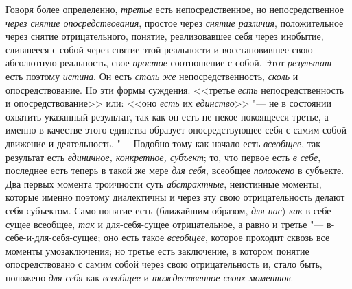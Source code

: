 Говоря более определенно, {\em третье} есть
непосредственное, но непосредственное
{\em через снятие опосредствования}, простое через {\em снятие
различия}, положительное через снятие отрицательного,
понятие, реализовавшее себя через инобытие, слившееся с собой через снятие
этой реальности и восстановившее свою абсолютную реальность, свое
{\em простое} соотношение с собой. Этот {\em результат} есть поэтому
{\em истина}. Он есть {\em столь же} непосредственность, {\em сколь} и
опосредствование. Но эти формы суждения: <<третье {\em есть}
непосредственность и опосредствование>> или: <<оно {\em есть} их
{\em единство}>> "--- не в
состоянии охватить указанный результат, так как он есть не некое покоящееся
третье, а именно в качестве этого единства образует опосредствующее себя с
самим собой движение и деятельность. "--- Подобно тому как
начало есть {\em всеобщее}, так результат есть
{\em единичное, конкретное, субъект}; то, что первое есть {\em в
себе}, последнее есть теперь в такой же мере {\em для себя}, всеобщее
{\em положено} в субъекте. Два первых момента троичности суть
{\em абстрактные}, неистинные моменты, которые именно поэтому диалектичны и
через эту свою отрицательность делают себя субъектом. Само понятие есть
(ближайшим образом, {\em для нас}) {\em как} в-себе-сущее
всеобщее, {\em так} и для-себя-сущее отрицательное, а равно и третье
"--- в-себе-и-для-себя-сущее; оно есть такое {\em всеобщее}, которое
проходит сквозь все моменты умозаключения; но третье есть заключение, в
котором понятие опосредствовано с самим собой через свою отрицательность и,
стало быть, положено {\em для себя} как {\em всеобщее}
и {\em тождественное своих моментов}.

